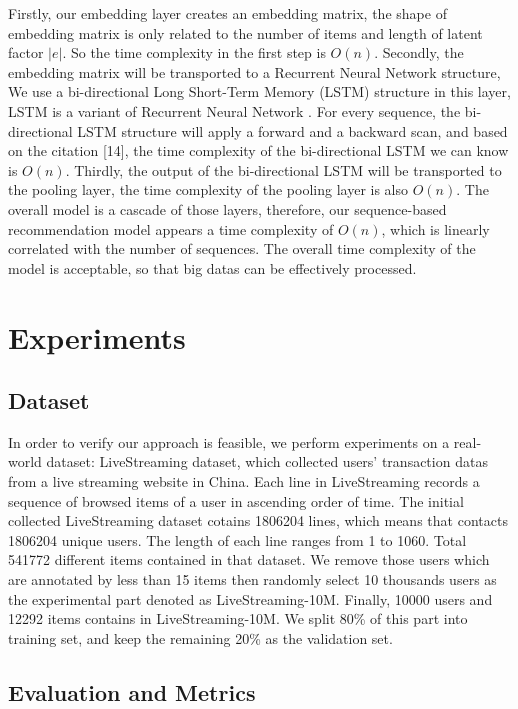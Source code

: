 \documentclass[runningheads]{llncs}
\begin{document}
Firstly, our embedding layer creates an embedding matrix, the shape of embedding matrix is only related to the number of items and length of latent factor $|e|$. So the time complexity in the first step is $O(n)$. Secondly, the embedding matrix will be transported to a Recurrent Neural Network structure, We use a bi-directional Long Short-Term Memory (LSTM) structure in this layer, LSTM is a variant of Recurrent Neural Network \cite{22}. For every sequence, the bi-directional LSTM structure will apply a forward and a backward scan, and based on the citation [14], the time complexity of the bi-directional LSTM we can know is $O(n)$. Thirdly, the output of the bi-directional LSTM will be transported to the pooling layer, the time complexity of the pooling layer is also $O(n)$. The overall model is a cascade of those layers, therefore, our sequence-based recommendation model appears a time complexity of $O(n)$, which is linearly correlated with the number of sequences. The overall time complexity of the model is acceptable, so that big datas can be effectively processed.


\section{Experiments}


\subsection{Dataset}

In order to verify our approach is feasible, we perform experiments on a real-world dataset: LiveStreaming dataset, which collected users' transaction datas from a live streaming website in China. Each line in LiveStreaming records a sequence of browsed items of a user in ascending order of time.  The initial collected LiveStreaming dataset cotains 1806204 lines, which means that contacts 1806204 unique users. The length of each line ranges from 1 to 1060. Total 541772 different items contained in that dataset. We remove those users which are annotated by less than 15 items then randomly select 10 thousands users as the experimental part denoted as LiveStreaming-10M. Finally, 10000 users and 12292 items contains in LiveStreaming-10M. We split 80\% of this part into training set, and keep the remaining 20\% as the validation set. 

\subsection{Evaluation and Metrics}
\end{document}
